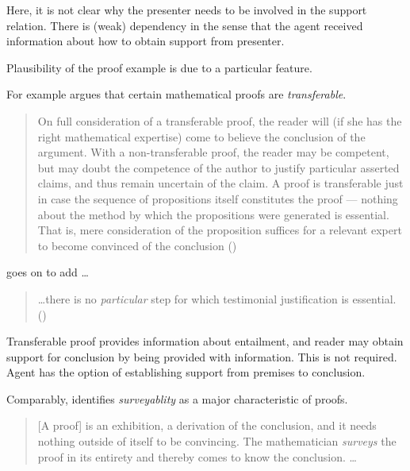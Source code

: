 \begin{note}[Explanation]
  Here, it is not clear why the presenter needs to be involved in the support relation.
  There is (weak) dependency in the sense that the agent received information about how to obtain support from presenter.
\end{note}

\begin{note}
  Plausibility of the proof example is due to a particular feature.

  For example \textcite{Easwaran:2009tm} argues that certain mathematical proofs are \emph{transferable}.

  \begin{quote}
    On full consideration of a transferable proof, the reader will (if she has the right mathematical expertise) come to believe the conclusion of the argument.
    With a non-transferable proof, the reader may be competent, but may doubt the competence of the author to justify particular asserted claims, and thus remain uncertain of the claim.
    A proof is transferable just in case the sequence of propositions itself constitutes the proof --- nothing about the method by which the propositions were generated is essential.
    That is, mere consideration of the proposition suffices for a relevant expert to become convinced of the conclusion\nolinebreak
    \mbox{}\hfill\mbox{(\citeyear[354]{Easwaran:2009tm})}
  \end{quote}
  \citeauthor{Easwaran:2009tm} goes on to add \dots
  \begin{quote}
    \dots there is no \emph{particular} step for which testimonial justification is essential.\nolinebreak
    \mbox{}\hfill\mbox{(\citeyear[355]{Easwaran:2009tm})}
  \end{quote}

  Transferable proof provides information about entailment, and reader may obtain support for conclusion by being provided with information.
  This is not required.
  Agent has the option of establishing support from premises to conclusion.

  Comparably, \textcite{Tymoczko:1979tx} identifies \emph{surveyablity} as a major characteristic of proofs.
  \begin{quote}
    [A proof] is an exhibition, a derivation of the conclusion, and it needs nothing outside of itself to be convincing.
    The mathematician \emph{surveys} the proof in its entirety and thereby comes to know the conclusion.
    \dots


\end{quote}
\end{note}
